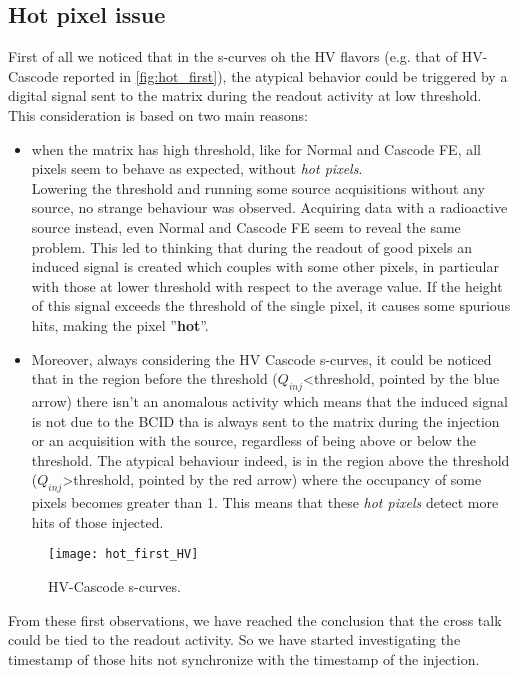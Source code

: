 \subsection{Hot pixel issue}

First of all we noticed that in the s-curves oh the HV flavors (e.g. that of HV-Cascode reported in  \autoref{fig:hot_first}), the atypical behavior could be triggered by a digital signal sent to the matrix during the readout activity at low threshold. This consideration is based on two main reasons:

\begin{itemize}
\item when the matrix has high threshold, like for Normal and Cascode FE, all pixels seem to behave as expected, without \textit{hot pixels}.\\ Lowering the threshold and running some source acquisitions without any source, no strange behaviour was observed. Acquiring data with a radioactive source instead, even Normal and Cascode FE seem to reveal the same problem. This led to thinking that during the readout of good pixels an induced signal is created which couples with some other pixels, in particular with those at lower threshold with respect to the average value. If the height of this signal exceeds the threshold of the single pixel, it causes some spurious hits, making the pixel ''\textbf{hot}''.

\item Moreover, always considering the HV Cascode s-curves, it could be noticed that in the region before the threshold ($Q_{inj}$<threshold, pointed by the blue arrow) there isn't an anomalous activity which means that the induced signal is not due to the BCID tha is always sent to the matrix during the injection or an acquisition with the source, regardless of being above or below the  threshold. The atypical behaviour indeed, is in the region above the threshold ($Q_{inj}$>threshold, pointed by the red arrow) where the occupancy of some pixels becomes greater than 1. This means that these \textit{hot pixels} detect more hits of those injected.

\end{itemize} 

\begin{figure}[h!]
\centering
\texttt{[image: hot\_first\_HV]}
\caption{HV-Cascode s-curves.}
\label{fig:hot_first}
\end{figure}

From these first observations, we have reached the conclusion that the cross talk could be tied to the readout activity. So we have started investigating the timestamp of those hits not synchronize with the timestamp of the injection.



